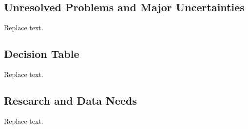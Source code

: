 \documentclass[11pt,
  english,
  a4paper,
]{article}
\begin{document}

\hypertarget{unresolved-problems-and-major-uncertainties}{%
\subsection*{Unresolved Problems and Major Uncertainties}\label{unresolved-problems-and-major-uncertainties}}

\leavevmode\tagmcend\tagstructend


Replace text.

\leavevmode\tagmcend\tagstructend\par


\hypertarget{decision-table}{%
\subsection*{Decision Table}\label{decision-table}}

\leavevmode\tagmcend\tagstructend


Replace text.

\leavevmode\tagmcend\tagstructend\par


\hypertarget{research-and-data-needs}{%
\subsection*{Research and Data Needs}\label{research-and-data-needs}}

\leavevmode\tagmcend\tagstructend


Replace text.

\leavevmode\tagmcend\tagstructend\par

\pagebreak
\setlength{\parskip}{5mm plus1mm minus1mm}
\setcounter{page}{1}
\renewcommand{\thefigure}{\arabic{figure}}
\renewcommand{\thetable}{\arabic{table}}
\setcounter{table}{0}
\setcounter{figure}{0}
\end{document}
